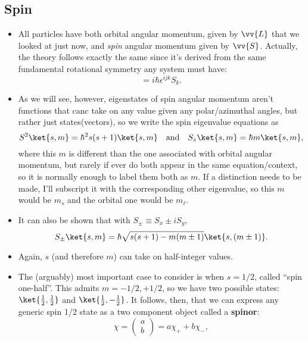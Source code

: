 \subsection*{Spin}
\begin{itemize}
    \item All particles have both orbital angular momentum, given by $\vv{L}$ that we looked at just now, and \textit{spin} angular momentum given by $\vv{S}$. Actually, the theory follows exactly the same since it's derived from the same fundamental rotational symmetry any system must have:
        \begin{equation}
            [S_i,S_j] = i\hbar \epsilon^{ijk} S_k.
        \end{equation}
    \item As we will see, however, eigenstates of spin angular momentum aren't functions that canc take on any value given any polar/azimuthal angles, but rather just states(vectors), so we write the spin eigenvalue equations as 
        \begin{equation}
            S^2 \ket{s,m} = \hbar^2 s(s+1)\ket{s,m} \quad\mathrm{and}\quad S_z\ket{s,m} = \hbar m \ket{s,m},
        \end{equation}
        where this $m$ is different than the one associated with orbital angular momentum, but rarely if ever do both appear in the same equation/context, so it is normally enough to label them both as $m$. If a distinction needs to be made, I'll subscript it with the corresponding other eigenvalue, so this $m$ would be $m_s$ and the orbital one would be $m_{\ell}$.
    \item It can also be shown that with $S_{\pm} \equiv S_x \pm iS_y$,
        \begin{equation}
            S_{\pm}\ket{s,m} = \hbar\sqrt{s(s+1) - m(m \pm 1)}\ket{s,(m\pm 1)}.
        \end{equation}
    \item Again, $s$ (and therefore $m$) can take on half-integer values.
    \item The (arguably) most important case to consider is when $s=1/2$, called ``spin one-half''. This admits $m = -1/2,+1/2$, so we have two possible states: $\ket{\frac{1}{2},\frac{1}{2}}$ and $\ket{\frac{1}{2},-\frac{1}{2}}$. It follows, then, that we can express any generic spin 1/2 state as a two component object called a \textbf{spinor}:
        \begin{equation}
            \chi = \begin{pmatrix}a \\ b\end{pmatrix} = a\chi_+ + b\chi_-,

\end{equation}
\end{itemize}
